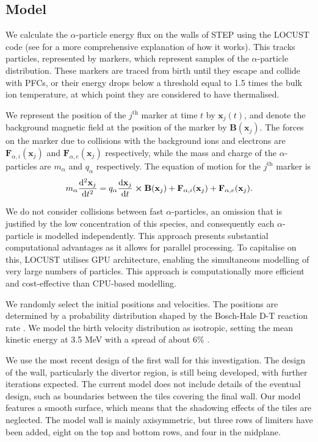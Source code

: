 \documentclass[10pt, a4paper, twoside]{article}
\begin{document}
\subsection{Model}

We calculate the $\alpha$-particle energy flux on the walls of STEP using the LOCUST code (see \cite{akers2018, ward2021} for a more comprehensive explanation of how it works). This tracks particles, represented by markers, which represent samples of the $\alpha$-particle distribution. These markers are traced from birth until they escape and collide with PFCs, or their energy drops below a threshold equal to 1.5 times the bulk ion temperature, at which point they are considered to have thermalised.

We represent the position of the $j^{\text{th}}$ marker at time $t$ by $\mathbf{x}_j(t)$, and denote
the background magnetic field at the position of the marker by $\textbf{B}(\mathbf{x}_j)$.
The forces on the marker due to collisions with the background ions and electrons are $\textbf{F}_{\alpha,i}(\mathbf{x}_j)$ and $\textbf{F}_{\alpha,e}(\mathbf{x}_j)$ respectively, while the mass and charge of the $\alpha$-particles are $m_\alpha$ and $q_\alpha$ respectively. The equation of motion for the $j^{\text{th}}$ marker is
\begin{equation}
m_\alpha\dv[2]{\mathbf{x}_j}{t} = q_\alpha\dv{\mathbf{x}_j}{t}\cross\textbf{B}(\mathbf{x}_j) + \textbf{F}_{\alpha,i}(\mathbf{x}_j) + \textbf{F}_{\alpha,e}(\mathbf{x}_j).
\end{equation}

We do not consider collisions between fast $\alpha$-particles, an omission that is justified by the low concentration of this species, and consequently each $\alpha$-particle is modelled independently. This approach presents substantial computational advantages as it allows for parallel processing. To capitalise on this, LOCUST utilises GPU architecture, enabling the simultaneous modelling of very large numbers of particles. This approach is computationally more efficient and cost-effective than CPU-based modelling. 

We randomly select the initial positions and velocities. The positions are determined by a probability distribution shaped by the Bosch-Hale D-T reaction rate \cite{bosch1992}. We model the birth velocity distribution as isotropic, setting the mean kinetic energy at 3.5 MeV with a spread of about 6\% \cite{brysk1973}. 

We use the most recent design of the first wall for this investigation. The design of the wall, particularly the divertor region, is still being developed, with further iterations expected. The current model does not include details of the eventual design, such as boundaries between the tiles covering the final wall. Our model features a smooth surface, which means that the shadowing effects of the tiles are neglected. The model wall is mainly axisymmetric, but three rows of limiters have been added, eight on the top and bottom rows, and four in the midplane. 
\end{document}
